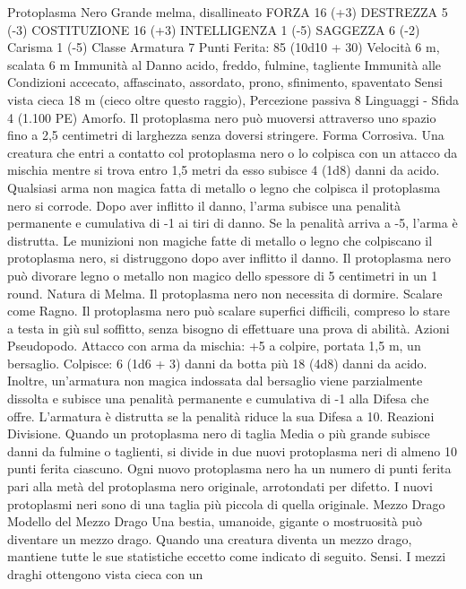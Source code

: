 \begin{multicols}{2}
Protoplasma Nero
Grande melma, disallineato
FORZA 16 (+3)
DESTREZZA 5 (-3)
COSTITUZIONE 16 (+3)
INTELLIGENZA 1 (-5)
SAGGEZZA 6 (-2)
Carisma 1 (-5)
Classe Armatura 7
\hspace*{0pt}\hfill{Punti Ferita}: 85 (10d10 + 30)
Velocità 6 m, scalata 6 m
Immunità al Danno acido, freddo, fulmine, tagliente
Immunità alle Condizioni accecato, affascinato, assordato,
prono, sfinimento, spaventato
Sensi vista cieca 18 m (cieco oltre questo raggio), Percezione
passiva 8
Linguaggi -
Sfida 4 (1.100 PE)
Amorfo. Il protoplasma nero può muoversi attraverso uno spazio
fino a 2,5 centimetri di larghezza senza doversi stringere.
Forma Corrosiva. Una creatura che entri a contatto col protoplasma
nero o lo colpisca con un attacco da mischia mentre si trova entro 1,5
metri da esso subisce 4 (1d8) danni da acido. Qualsiasi arma non
magica fatta di metallo o legno che colpisca il protoplasma nero si
corrode. Dopo aver inflitto il danno, l’arma subisce una penalità
permanente e cumulativa di -1 ai tiri di danno. Se la penalità arriva a
-5, l’arma è distrutta. Le munizioni non magiche fatte di metallo o
legno che colpiscano il protoplasma nero, si distruggono dopo aver
inflitto il danno.
Il protoplasma nero può divorare legno o metallo non magico dello
spessore di 5 centimetri in un 1 round.
Natura di Melma. Il protoplasma nero non necessita di dormire.
Scalare come Ragno. Il protoplasma nero può scalare superfici
difficili, compreso lo stare a testa in giù sul soffitto, senza
bisogno di effettuare una prova di abilità.
Azioni
Pseudopodo. Attacco con arma da mischia: +5 a colpire, portata
1,5 m, un bersaglio.
Colpisce: 6 (1d6 + 3) danni da botta più 18 (4d8) danni da
acido. Inoltre, un’armatura non magica indossata dal bersaglio
viene parzialmente dissolta e subisce una penalità permanente e
cumulativa di -1 alla Difesa che offre. L’armatura è distrutta se la
penalità riduce la sua Difesa a 10.
Reazioni
Divisione. Quando un protoplasma nero di taglia Media o più grande
subisce danni da fulmine o taglienti, si divide in due nuovi
protoplasma neri di almeno 10 punti ferita ciascuno. Ogni nuovo
protoplasma nero ha un numero di punti ferita pari alla metà del
protoplasma nero originale, arrotondati per difetto. I nuovi
protoplasmi neri sono di una taglia più piccola di quella originale.
Mezzo Drago
Modello del Mezzo Drago
Una bestia, umanoide, gigante o mostruosità può
diventare un mezzo drago. Quando una creatura
diventa un mezzo drago, mantiene tutte le sue
statistiche eccetto come indicato di seguito.
Sensi. I mezzi draghi ottengono vista cieca con un

\end{multicols}
